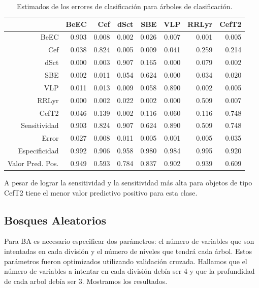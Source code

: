 \documentclass[letterpaper,12pt]{book}
\begin{document}
\begin{table}[ht]
  \centering
  \begin{tabular}{rrrrrrrr}
    \hline
    \hline
    & BeEC & Cef & dSct & SBE & VLP & RRLyr & CefT2 \\ 
    \hline
    \hline
    BeEC & 0.903 & 0.008 & 0.002 & 0.026 & 0.007 & 0.001 & 0.005 \\ 
    Cef & 0.038 & 0.824 & 0.005 & 0.009 & 0.041 & 0.259 & 0.214 \\ 
    dSct & 0.000 & 0.003 & 0.907 & 0.165 & 0.000 & 0.079 & 0.002 \\ 
    SBE & 0.002 & 0.011 & 0.054 & 0.624 & 0.000 & 0.034 & 0.020 \\ 
    VLP & 0.011 & 0.013 & 0.009 & 0.058 & 0.890 & 0.002 & 0.005 \\ 
    RRLyr & 0.000 & 0.002 & 0.022 & 0.002 & 0.000 & 0.509 & 0.007 \\ 
    CefT2 & 0.046 & 0.139 & 0.002 & 0.116 & 0.060 & 0.116 & 0.748 \\ 
    \hline
    \hline
    Sensitividad & 0.903 & 0.824 & 0.907 & 0.624 & 0.890 & 0.509 & 0.748 \\ 
    \hline
    Error & 0.027 & 0.008 & 0.011 & 0.005 & 0.001 & 0.005 & 0.035 \\ 
    \hline
    \hline
    Especificidad &  0.992 & 0.906 & 0.958 & 0.980 & 0.984 & 0.995 & 0.920 \\
    \hline
    \hline
Valor Pred. Pos. & 0.949 & 0.593 & 0.784 & 0.837 & 0.902 & 0.939 & 0.609 \\ 
    \hline
    \hline
  \end{tabular}
  \caption{Estimados de los errores de clasificación para árboles de clasificación.}
\end{table}

A pesar de lograr la sensitividad y la sensitividad más alta para objetos de tipo CefT2 tiene el menor valor predictivo positivo para esta clase. 


\subsection{Bosques Aleatorios}

Para BA es necesario especificar dos parámetros: el número de variables que son intentadas en cada división y el número de niveles que tendrá cada árbol. Estos parámetros fueron optimizados utilizando validación cruzada. Hallamos que el número de variables a intentar en cada división debía ser 4 y que la profundidad de cada arbol debía ser 3. Mostramos los resultados.
\end{document}
